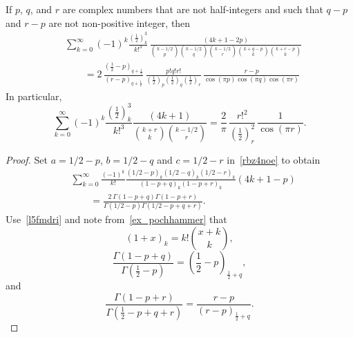 \documentclass[12pt,reqno]{article}
\begin{document}
\begin{theorem}
If $p$, $q$, and $r$ are complex numbers that are not half-integers and such that $q-p$ and $r-p$ are not non-positive integer, then
\begin{align}
&\sum_{k = 0}^\infty  {( - 1)^k \frac{{\left( {\frac{1}{2}} \right)_k^3 }}{{k!^3 }}\,\frac{{\left( {4k + 1 - 2p} \right)}}{{\binom{{k - 1/2}}{p}\binom{{k - 1/2}}{q}\binom{{k - 1/2}}{r}\binom{{k + q - p}}{k}\binom{{k + r - p}}{k}}}}\\
&\qquad= 2\,\frac{{\left( {\frac{1}{2} - p} \right)_{q + \frac{1}{2}} }}{{\left( {r - p} \right)_{q + \frac{1}{2}} }}\,\frac{{p!q!r!}}{{\left( {\frac{1}{2}} \right)_p \left( {\frac{1}{2}} \right)_q \left( {\frac{1}{2}} \right)_r }}\,\frac{{r - p}}{{\cos \left( {\pi p} \right)\cos \left( {\pi q} \right)\cos \left( {\pi r} \right)}} 
\end{align}
In particular,
\begin{equation}
\sum_{k = 0}^\infty  {( - 1)^k \frac{{\left( {\frac{1}{2}} \right)_k^3 }}{{k!^3 }}\frac{{\left( {4k + 1} \right)}}{{\binom{{k + r}}{k}\binom{{k - 1/2}}{r}}}}  = \frac{2}{\pi }\,\frac{{r!^2 }}{{\left( {\frac{1}{2}} \right)_r^2 }}\,\frac{1}{{\cos \left( \pi r \right)}}.
\end{equation}
\end{theorem}
\begin{proof}
Set $a=1/2-p$, $b=1/2-q$ and $c=1/2-r$ in~\eqref{rbz4noe} to obtain
\begin{align}\label{h7933kq}
&\sum_{k = 0}^\infty  {\frac{{( - 1)^k }}{{k!}}\frac{{\left( {1/2 - p} \right)_k \left( {1/2 - q} \right)_k \left( {1/2 - r} \right)_k }}{{\left( {1 - p + q} \right)_k \left( {1 - p + r} \right)_k }}\left( {4k + 1 - p} \right)}\nonumber\\
&\qquad  = \frac{{2\,\Gamma \left( {1 - p + q} \right)\Gamma \left( {1 - p + r} \right)}}{{\Gamma \left( {1/2 - p} \right)\Gamma \left( {1/2 - p + q + r} \right)}} .
\end{align}
Use~\eqref{l5fmdri} and note from~\eqref{ex_pochhammer} that
\begin{equation}\label{nly5agg}
\left( {1 + x} \right)_k  = k!\binom{{x + k}}{k},
\end{equation}
\begin{equation}
\frac{{\Gamma \left( {1 - p + q} \right)}}{{\Gamma \left( {\frac{1}{2} - p} \right)}} = \left( {\frac{1}{2} - p} \right)_{\frac{1}{2} + q} ,
\end{equation}
and
\begin{equation}
\frac{{\Gamma \left( {1 - p + r} \right)}}{{\Gamma \left( {\frac{1}{2} - p + q + r} \right)}} = \frac{{r - p}}{{\left( {r - p} \right)_{\frac{1}{2} + q} }}.
\end{equation}
\end{proof}
\end{document}
